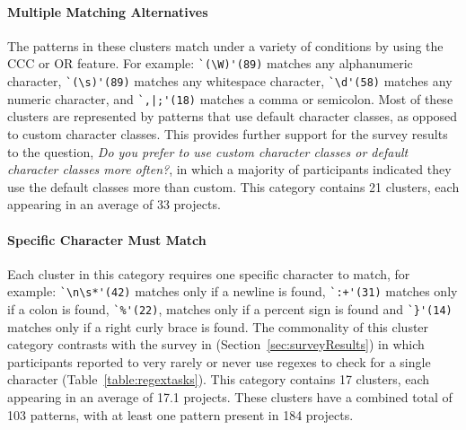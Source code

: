 \paragraph{Multiple Matching Alternatives}
The patterns in these clusters match under a variety of conditions by using the CCC or OR feature.  For example: \verb!`(\W)'(89)! matches any alphanumeric character, \verb!`(\s)'(89)! matches any whitespace character, \verb!`\d'(58)! matches any numeric character, and \verb!`,|;'(18)! matches a comma or semicolon.  Most of these clusters are represented by patterns that use default character classes, as opposed to custom character classes.  This provides further support for the survey results to the question, \emph{Do you prefer to use custom character classes or default character classes more often?}, in which a majority of participants indicated they use the default classes more than custom.
This category contains 21 clusters, each appearing in an average of 33 projects.

\paragraph{Specific Character Must Match}
\label{cluster:single}
Each cluster in this category requires one specific character to match, for example:
\verb!`\n\s*'(42)! matches only if a newline is found, \verb!`:+'(31)! matches only if a colon is found, \verb!`%'(22)!, matches only if a percent sign is found and \verb!`}'(14)! matches only if a right curly brace is found.
The commonality of this cluster category contrasts with the survey in
(Section~\ref{sec:surveyResults}) in which participants reported to very rarely or never use regexes to check for a single character (Table~\ref{table:regextasks}).
This category contains 17 clusters, each appearing in an average of 17.1 projects.
These clusters have a combined total of 103 patterns, with at least one pattern present in 184 projects.

